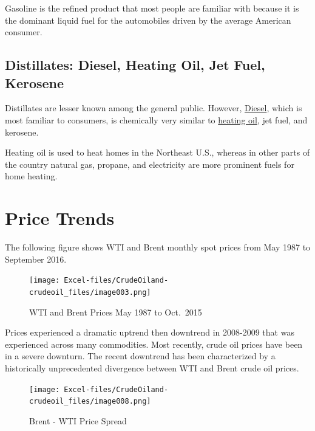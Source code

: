 \documentclass[
  letterpaper,
  DIV=11,
  numbers=noendperiod]{scrreprt}
\begin{document}
Gasoline is the refined product that most people are familiar with
because it is the dominant liquid fuel for the automobiles driven by the
average American consumer.

\hypertarget{distillates-diesel-heating-oil-jet-fuel-kerosene}{%
\subsection{Distillates: Diesel, Heating Oil, Jet Fuel,
Kerosene}\label{distillates-diesel-heating-oil-jet-fuel-kerosene}}

Distillates are lesser known among the general public. However,
\href{http://www.eia.gov/Energyexplained/index.cfm?page=diesel_home}{Diesel},
which is most familiar to consumers, is chemically very similar to
\href{http://www.eia.gov/Energyexplained/index.cfm?page=heating_oil_use}{heating
oil}, jet fuel, and kerosene.

Heating oil is used to heat homes in the Northeast U.S., whereas in
other parts of the country natural gas, propane, and electricity are
more prominent fuels for home heating.

\hypertarget{price-trends}{%
\section{Price Trends}\label{price-trends}}

The following figure shows WTI and Brent monthly spot prices from May
1987 to September 2016.

\begin{figure}

{\centering \texttt{[image: Excel-files/CrudeOiland-crudeoil\_files/image003.png]}

}

\caption{WTI and Brent Prices May 1987 to Oct.~2015}

\end{figure}

Prices experienced a dramatic uptrend then downtrend in 2008-2009 that
was experienced across many commodities. Most recently, crude oil prices
have been in a severe downturn. The recent downtrend has been
characterized by a historically unprecedented divergence between WTI and
Brent crude oil prices.

\begin{figure}

{\centering \texttt{[image: Excel-files/CrudeOiland-crudeoil\_files/image008.png]}

}

\caption{Brent - WTI Price Spread}

\end{figure}
\end{document}
